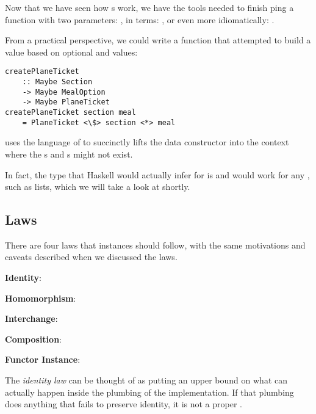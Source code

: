 Now that we have seen how s work, we have the tools needed to finish ping a function 
with two parameters: , in  terms: ,
or even more idiomatically: .

From a practical perspective, we could write a function that attempted to build a  value based on
optional  and  values:

\begin{lstlisting}
createPlaneTicket
    :: Maybe Section
    -> Maybe MealOption
    -> Maybe PlaneTicket
createPlaneTicket section meal
    = PlaneTicket <\$> section <*> meal
\end{lstlisting}

 uses the language of  to succinctly lifts the  data constructor
into the  context where the s and s might not exist.

In fact, the type that Haskell would actually infer for  is
 and would work for any , such as 
lists, which we will take a look at shortly.

\subsection{ Laws}

There are four laws that  instances should follow, with the same motivations and caveats described when
we discussed the  laws.

\begin{notelist}
    \item \textbf{Identity}: 
    \item \textbf{Homomorphism}: 
    \item \textbf{Interchange}: 
    \item \textbf{Composition}: 
    \item \textbf{Functor Instance}: 
\end{notelist}

The \textit{identity law} can be thought of as putting an upper bound on what can actually happen inside the plumbing of
the  implementation. If that plumbing does anything that fails to preserve identity, it
is not a proper .

